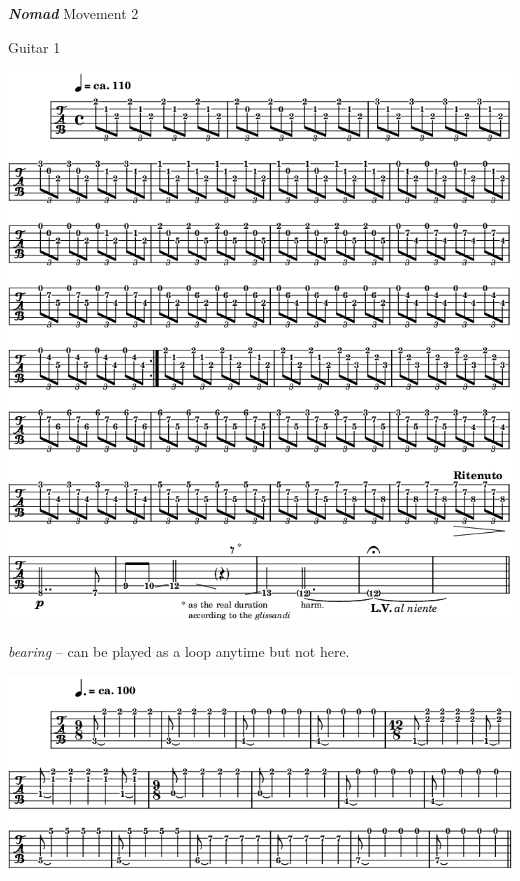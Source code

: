 \newpage

\textbf{\textsl{Nomad}} Movement 2 

\smallskip

 \quad Guitar 1

\begin{center}
\includegraphics[width=\textwidth-1cm]{img/neB1}
\end{center}

 \quad \quad \quad \textit{bearing}  {\scriptsize -- can be played as a loop anytime but not here.}

\begin{center}
\includegraphics[width=\textwidth-1cm]{img/neB1r}
\end{center}

